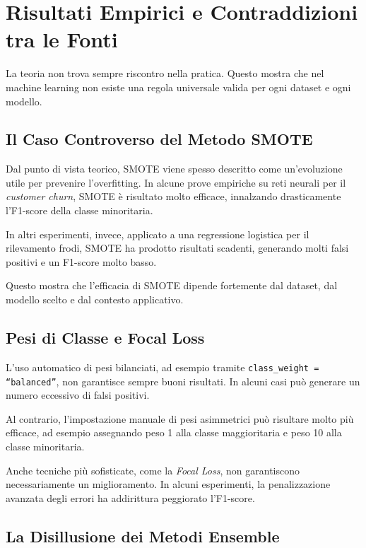 \documentclass[11pt, a4paper]{article}
\begin{document}
\section{Risultati Empirici e Contraddizioni tra le Fonti}

La teoria non trova sempre riscontro nella pratica. Questo mostra che nel machine
learning non esiste una regola universale valida per ogni dataset e ogni modello.

\subsection{Il Caso Controverso del Metodo SMOTE}

Dal punto di vista teorico, SMOTE viene spesso descritto come un'evoluzione utile
per prevenire l'overfitting. In alcune prove empiriche su reti neurali per il
\emph{customer churn}, SMOTE è risultato molto efficace, innalzando
drasticamente l'F1-score della classe minoritaria.

In altri esperimenti, invece, applicato a una regressione logistica per il
rilevamento frodi, SMOTE ha prodotto risultati scadenti, generando molti falsi
positivi e un F1-score molto basso.

Questo mostra che l'efficacia di SMOTE dipende fortemente dal dataset, dal
modello scelto e dal contesto applicativo.

\subsection{Pesi di Classe e Focal Loss}

L'uso automatico di pesi bilanciati, ad esempio tramite
\texttt{class\_weight = ``balanced''}, non garantisce sempre buoni risultati.
In alcuni casi può generare un numero eccessivo di falsi positivi.

Al contrario, l'impostazione manuale di pesi asimmetrici può risultare molto più
efficace, ad esempio assegnando peso 1 alla classe maggioritaria e peso 10 alla
classe minoritaria.

Anche tecniche più sofisticate, come la \emph{Focal Loss}, non garantiscono
necessariamente un miglioramento. In alcuni esperimenti, la penalizzazione
avanzata degli errori ha addirittura peggiorato l'F1-score.

\subsection{La Disillusione dei Metodi Ensemble}
\end{document}
